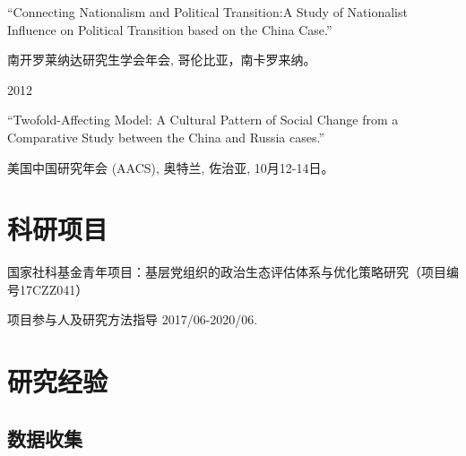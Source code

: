 \documentclass[10.5pt,]{article}
\providecommand{\tightlist}{%
	\setlength{\itemsep}{0pt}\setlength{\parskip}{0pt}}
\renewenvironment{itemize}{
	\begin{list}{}{
			\setlength{\leftmargin}{1.5em}
		}
	}{
	\end{list}
}
\begin{document}
\begin{itemize}
  \begin{itemize}
  \tightlist
  \item
    ``Connecting Nationalism and Political Transition:A Study of
    Nationalist Influence on Political Transition based on the China
    Case.''

    \begin{itemize}
    \tightlist
    \item
      \footnotesize 南开罗莱纳达研究生学会年会, 哥伦比亚，南卡罗来纳。
    \end{itemize}
  \end{itemize}
\item
  2012

  \begin{itemize}
  \tightlist
  \item
    ``Twofold-Affecting Model: A Cultural Pattern of Social Change from
    a Comparative Study between the China and Russia cases.''

    \begin{itemize}
    \tightlist
    \item
      \footnotesize 美国中国研究年会 (AACS), 奥特兰, 佐治亚,
      10月12-14日。
    \end{itemize}
  \end{itemize}
\end{itemize}

\section{科研项目}

\begin{itemize}
\tightlist
\item
  国家社科基金青年项目：基层党组织的政治生态评估体系与优化策略研究（项目编号17CZZ041）

  \begin{itemize}
  \tightlist
  \item
    项目参与人及研究方法指导 \hfill 2017/06-2020/06.
  \end{itemize}
\end{itemize}

\section{研究经验}

\subsection{数据收集}
\end{document}
